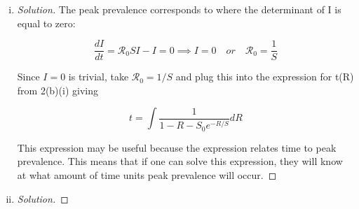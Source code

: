 \documentclass[12pt]{article}
\begin{document}
\begin{enumerate}[(a)]
\begin{enumerate}[(i)]
{\begin{proof}[Solution]
	From equation~\eqref{E:SIR}
	
	\begin{equation}
	\frac{dR}{dt}=1-R-S_0e^{-\mathcal{R}_0R}
	\end{equation}
	
	We can solve this as a separable equation to  get the expression for t(R)
	
	\begin{equation}
	t=\int \frac{1}{1-R-S_0e^{-\mathcal{R}_0R}}dR
	\end{equation}
	
\end{proof}
}

 \item \basicSIRanalQbii

{\color{blue}
\begin{proof}[Solution]
	The peak prevalence corresponds to where the determinant of I is equal to zero:
	
	\begin{equation}
	\frac{dI}{dt}=\mathcal{R}_0 SI-I=0 \implies I=0 \quad or \quad  \mathcal{R}_0=\frac{1}{S}
	\end{equation}
	
	Since $I=0$ is trivial, take $\mathcal{R}_0=1/S$ and plug this into the expression for t(R) from 2(b)(i) giving 
	
	\begin{equation}
	t=\int \frac{1}{1-R-S_0e^{-R/S}}dR
	\end{equation}

	This expression may be useful because the expression relates time to peak prevalence. This means that if one can solve this expression, they will know at what amount of time units peak prevalence will occur.

\end{proof}
}

  \item \basicSIRanalQbiii
  
{\color{blue}
\begin{proof}[Solution]


\end{proof}}
\end{enumerate}
\end{enumerate}
\end{document}
